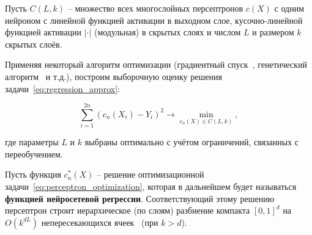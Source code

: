 Пусть \(C(L, k)\) -- множество всех многослойных персептронов \(c(X)\) с одним нейроном с линейной функцией активации в выходном слое, кусочно-линейной функцией активации \(|\cdot|\) (модульная) в скрытых слоях и числом \(L\) и размером \(k\) скрытых слоёв.


Применяя некоторый алгоритм оптимизации (градиентный спуск~\cite{amari1993backpropagation}, генетический алгоритм~\cite{seiffert2001multiple} и т.д.), построим выборочную оценку решения задачи~\cref{eq:regression_approx}:

\begin{equation}
    \label{eq:perceptron_optimization}
    \sum\limits_{i=1}^{2n} (c_n(X_i) - Y_i)^2 \rightarrow \min\limits_{c_n(X)\in C(L, k)},
\end{equation}

\noindent где параметры \(L\) и \(k\) выбраны оптимально с учётом ограничений, связанных с переобучением.

Пусть функция \(c_n^*(X)\) -- решение оптимизационной задачи~\cref{eq:perceptron_optimization}, которая в дальнейшем будет называться \textbf{функцией нейросетевой регрессии}. Соответствующий этому решению персептрон строит иерархическое (по слоям) разбиение компакта \([0, 1]^d\) на \(O(k^{dL})\) непересекающихся ячеек~\cite{devroye2013probabilistic} (при \(k > d\)).


